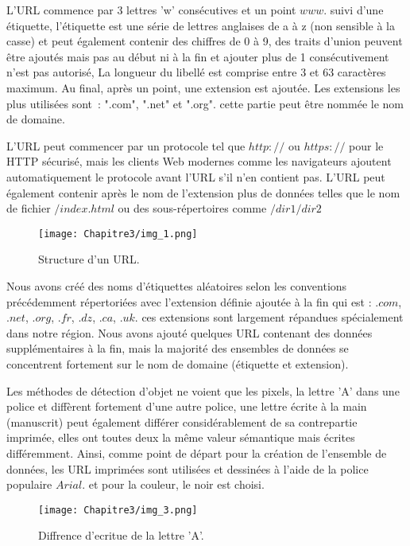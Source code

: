           L'URL commence par 3 lettres 'w' consécutives et un point \(www.\) suivi d'une étiquette, l'étiquette est une série de lettres anglaises de a à z (non sensible à la casse) et peut également contenir des chiffres de 0 à 9, des traits d'union peuvent être ajoutés mais pas au début ni à la fin et ajouter plus de 1 consécutivement n'est pas autorisé, La longueur du libellé est comprise entre 3 et 63 caractères maximum. Au final, après un point, une extension est ajoutée. Les extensions les plus utilisées sont : ".com", ".net" et ".org". cette partie peut être nommée le nom de domaine.

          L'URL peut commencer par un protocole tel que \(http://\) ou \(https://\) pour le HTTP sécurisé, mais les clients Web modernes comme les navigateurs ajoutent automatiquement le protocole avant l'URL s'il n'en contient pas. L'URL peut également contenir après le nom de l'extension plus de données telles que le nom de fichier \(/index.html\) ou des sous-répertoires comme \(/dir1/dir2\)
          \begin{figure}[H]
               \centering
               \texttt{[image: Chapitre3/img\_1.png]}
               \caption{Structure d'un URL.}
               \label{img3}
               \end{figure}

          Nous avons créé des noms d'étiquettes aléatoires selon les conventions précédemment répertoriées avec l'extension définie ajoutée à la fin qui est : \(.com\), \(.net\), \(.org\), \(.fr\), \(.dz\), \(.ca\), \(.uk\). ces extensions sont largement répandues spécialement dans notre région. Nous avons ajouté quelques URL contenant des données supplémentaires à la fin, mais la majorité des ensembles de données se concentrent fortement sur le nom de domaine (étiquette et extension).
          
          Les méthodes de détection d'objet ne voient que les pixels, la lettre 'A' dans une police et diffèrent fortement d'une autre police, une lettre écrite à la main (manuscrit) peut également différer considérablement de sa contrepartie imprimée, elles ont toutes deux la même valeur sémantique mais écrites différemment. Ainsi, comme point de départ pour la création de l'ensemble de données, les URL imprimées sont utilisées et dessinées à l'aide de la police populaire \(Arial\). et pour la couleur, le noir est choisi.
          \begin{figure}[H]
               \centering
               \texttt{[image: Chapitre3/img\_3.png]}
               \caption{Diffrence d'ecritue de la lettre 'A'.}
               \label{img4}
               \end{figure}


